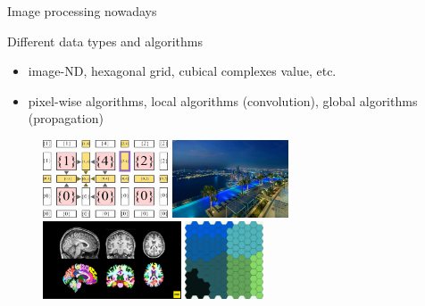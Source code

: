 \documentclass[12pt,aspectratio=169]{beamer}
\begin{document}
\begin{frame}[fragile]{Image processing nowadays}
  \begin{alertblock}{Different data types and algorithms}
    \begin{itemize}
      \item image-ND, hexagonal grid, cubical complexes value, etc.
      \item pixel-wise algorithms, local algorithms (convolution), global algorithms (propagation)
    \end{itemize}
  \end{alertblock}
  \begin{figure}[bl]
    \centering
    \hfill
    \includegraphics[height=2.3cm]{../illustrations/cubical_complex}
    \hfill
    \includegraphics[height=2.3cm]{../illustrations/2d_rgb8_holiday_image}
    \hfill
    \includegraphics[height=2.3cm]{../illustrations/3d_medical_image}
    \hfill
    \includegraphics[height=2.3cm]{../illustrations/hexagonal_grid2}
    \hspace{1cm}
  \end{figure}
\end{frame}
\end{document}
